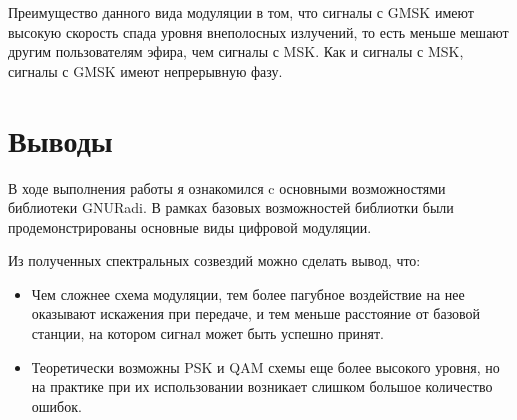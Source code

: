 Преимущество данного вида модуляции в том, что сигналы с GMSK имеют высокую скорость спада уровня внеполосных излучений, то есть меньше мешают другим пользователям эфира, чем сигналы с MSK. Как и сигналы с MSK, сигналы с GMSK имеют непрерывную фазу.

\newpage
\section{Выводы}
В ходе выполнения работы я ознакомился c основными возможностями библиотеки GNURadi. В рамках базовых возможностей библиотки были продемонстрированы основные виды цифровой модуляции.

Из полученных спектральных созвездий можно сделать вывод, что: 
\begin{itemize}
	\item Чем сложнее схема модуляции, тем более пагубное воздействие на нее оказывают искажения при передаче, и тем меньше расстояние от базовой станции, на котором сигнал может быть успешно принят.
	
	\item Теоретически возможны PSK и QAM схемы еще более высокого уровня, но на практике при их использовании возникает слишком большое количество ошибок.
\end{itemize}


